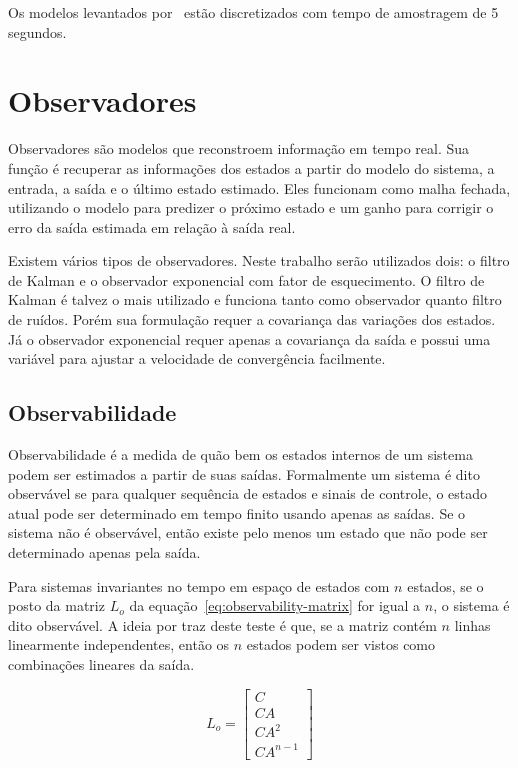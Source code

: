Os modelos levantados por~\textcite{masterthesis:nelson} estão discretizados com
tempo de amostragem de 5 segundos.

\section{Observadores}%
\label{sec:observers}

Observadores são modelos que reconstroem informação em tempo real. Sua função é
recuperar as informações dos estados a partir do modelo do sistema, a entrada, a
saída e o último estado estimado. Eles funcionam como malha fechada, utilizando
o modelo para predizer o próximo estado e um ganho para corrigir o erro da saída
estimada em relação à saída real.

Existem vários tipos de observadores. Neste trabalho serão utilizados dois: o
filtro de Kalman e o observador exponencial com fator de esquecimento. O filtro
de Kalman é talvez o mais utilizado e funciona tanto como observador quanto
filtro de ruídos. Porém sua formulação requer a covariança das variações dos
estados. Já o observador exponencial requer apenas a covariança da saída e
possui uma variável para ajustar a velocidade de convergência facilmente.

\subsection{Observabilidade}%
\label{subsec:observability}

Observabilidade é a medida de quão bem os estados internos de um sistema podem
ser estimados a partir de suas saídas. Formalmente um sistema é dito observável
se para qualquer sequência de estados e sinais de controle, o estado atual pode
ser determinado em tempo finito usando apenas as saídas. Se o sistema não é
observável, então existe pelo menos um estado que não pode ser determinado
apenas pela saída.

Para sistemas invariantes no tempo em espaço de estados com \( n \) estados, se
o posto da matriz \( L_o \) da equação~\eqref{eq:observability-matrix} for igual
a \( n \), o sistema é dito observável. A ideia por traz deste teste é que, se a
matriz contém \( n \) linhas linearmente independentes, então os \( n \) estados
podem ser vistos como combinações lineares da saída.

\begin{equation}
	\label{eq:observability-matrix}
	L_o = \begin{bmatrix}
		C    \\
		CA   \\
		CA^2 \\
		CA^{n-1}
	\end{bmatrix}
\end{equation}

